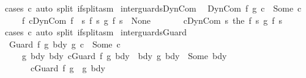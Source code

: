 \begin{isabellebody}
\ {\isacharparenleft}cases\ c{}{\isacharparenright}\ {\isacharparenleft}auto\ split{\isacharcolon}\ if{\isacharunderscore}split{\isacharunderscore}asm{\isacharparenright}%
\endisatagproof
{\isafoldproof}%
%
\isadelimproof
\isanewline
%
\endisadelimproof
\isanewline
{}\isamarkupfalse%
\ inter{\isacharunderscore}guards{\isacharunderscore}DynCom{\isacharcolon}\isanewline
\ \ {\isachardoublequoteopen}{\isacharparenleft}DynCom\ f{}\ {\isasyminter}\isactrlsub g\ c{}{\isacharparenright}\ {\isacharequal}\ Some\ c\ {\isacharequal}\isanewline
\ \ \ \ \ {\isacharparenleft}{\isasymexists}f{}{\isachardot}\ c{}{\isacharequal}DynCom\ f{}\ {\isasymand}\ {\isacharparenleft}{\isasymforall}s{\isachardot}\ {\isacharparenleft}{\isacharparenleft}f{}\ s{\isacharparenright}\ {\isasyminter}\isactrlsub g\ {\isacharparenleft}f{}\ s{\isacharparenright}{\isacharparenright}\ {\isasymnoteq}\ None{\isacharparenright}\ {\isasymand}\isanewline
\ \ \ \ \ \ c{\isacharequal}DynCom\ {\isacharparenleft}{\isasymlambda}s{\isachardot}\ the\ {\isacharparenleft}{\isacharparenleft}f{}\ s{\isacharparenright}\ {\isasyminter}\isactrlsub g\ {\isacharparenleft}f{}\ s{\isacharparenright}{\isacharparenright}{\isacharparenright}{\isacharparenright}{\isachardoublequoteclose}\isanewline
%
\isadelimproof
\ \ %
\endisadelimproof
%
\isatagproof
{}\isamarkupfalse%
\ {\isacharparenleft}cases\ c{}{\isacharparenright}\ {\isacharparenleft}auto\ split{\isacharcolon}\ if{\isacharunderscore}split{\isacharunderscore}asm{\isacharparenright}%
\endisatagproof
{\isafoldproof}%
%
\isadelimproof
\isanewline
%
\endisadelimproof
\isanewline
\isanewline
{}\isamarkupfalse%
\ inter{\isacharunderscore}guards{\isacharunderscore}Guard{\isacharcolon}\isanewline
\ \ {\isachardoublequoteopen}{\isacharparenleft}Guard\ f\ g{}\ bdy{}\ {\isasyminter}\isactrlsub g\ c{}{\isacharparenright}\ {\isacharequal}\ Some\ c\ {\isacharequal}\isanewline
\ \ \ \ \ {\isacharparenleft}{\isasymexists}g{}\ bdy{}\ bdy{\isachardot}\ c{}{\isacharequal}Guard\ f\ g{}\ bdy{}\ {\isasymand}\ {\isacharparenleft}bdy{}\ {\isasyminter}\isactrlsub g\ bdy{}{\isacharparenright}\ {\isacharequal}\ Some\ bdy\ {\isasymand}\isanewline
\ \ \ \ \ \ \ c{\isacharequal}Guard\ f\ {\isacharparenleft}g{}\ {\isasyminter}\ g{}{\isacharparenright}\ bdy{\isacharparenright}{\isachardoublequoteclose}\ \isanewline

\end{isabellebody}
